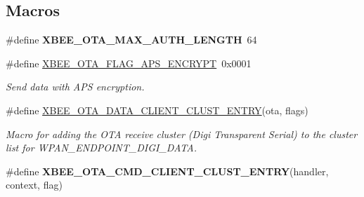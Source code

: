 \subsection*{Macros}
\begin{DoxyCompactItemize}
\item 
\hypertarget{group__xbee__ota__client_gabdc98be69226a7bbd2eb8dc231948688}{\#define {\bfseries X\-B\-E\-E\-\_\-\-O\-T\-A\-\_\-\-M\-A\-X\-\_\-\-A\-U\-T\-H\-\_\-\-L\-E\-N\-G\-T\-H}~64}\label{group__xbee__ota__client_gabdc98be69226a7bbd2eb8dc231948688}

\item 
\hypertarget{group__xbee__ota__client_ga2febaa0d599fc4f6fd94fbcf232f8d09}{\#define \hyperlink{group__xbee__ota__client_ga2febaa0d599fc4f6fd94fbcf232f8d09}{X\-B\-E\-E\-\_\-\-O\-T\-A\-\_\-\-F\-L\-A\-G\-\_\-\-A\-P\-S\-\_\-\-E\-N\-C\-R\-Y\-P\-T}~0x0001}\label{group__xbee__ota__client_ga2febaa0d599fc4f6fd94fbcf232f8d09}

\begin{DoxyCompactList}\small\item\em Send data with A\-P\-S encryption. \end{DoxyCompactList}\item 
\#define \hyperlink{group__xbee__ota__client_ga35fda0f9b1d07269c75d0407f3b26425}{X\-B\-E\-E\-\_\-\-O\-T\-A\-\_\-\-D\-A\-T\-A\-\_\-\-C\-L\-I\-E\-N\-T\-\_\-\-C\-L\-U\-S\-T\-\_\-\-E\-N\-T\-R\-Y}(ota, flags)
\begin{DoxyCompactList}\small\item\em Macro for adding the O\-T\-A receive cluster (Digi Transparent Serial) to the cluster list for W\-P\-A\-N\-\_\-\-E\-N\-D\-P\-O\-I\-N\-T\-\_\-\-D\-I\-G\-I\-\_\-\-D\-A\-T\-A. \end{DoxyCompactList}\item 
\#define {\bfseries X\-B\-E\-E\-\_\-\-O\-T\-A\-\_\-\-C\-M\-D\-\_\-\-C\-L\-I\-E\-N\-T\-\_\-\-C\-L\-U\-S\-T\-\_\-\-E\-N\-T\-R\-Y}(handler, context, flag)
\end{DoxyCompactItemize}

